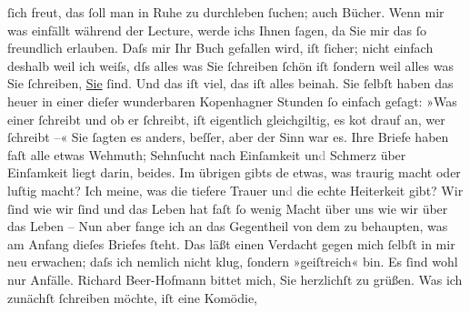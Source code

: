 \begin{ledgroupsized}[t]{13cm}
               ſich freut, das ſoll man in Ruhe zu durchleben ſuchen; auch Bücher. Wenn mir was
               einfällt während der Lecture, werde ichs Ihnen ſagen, da Sie mir das ſo freundlich
               erlauben. Daſs {\pb}mir Ihr Buch gefallen wird, iſt
               ſicher; nicht einfach deshalb weil ich weiſs, dſs alles was Sie ſchreiben ſchön iſt
               ſondern weil alles was Sie ſchreiben, \uline{Sie}{ }ſind. Und das iſt viel, das iſt alles beinah. Sie
               ſelbſt haben das heuer in einer dieſer wunderbaren Kopenhagner Stunden ſo einfach geſagt: »Was einer ſchreibt und ob er
               ſchreibt, iſt eigentlich gleichgiltig, es ko{\geminationm}t drauf an,
               wer ſchreibt –« Sie ſagten es anders, beſſer, aber der Sinn {\pb}war es.\pend
           \pstart
           Ihre Briefe haben faſt alle etwas Wehmuth; Sehnſucht nach Einſamkeit
                  un\textcolor{gray}{d}{ }Schmerz über Einſamkeit liegt darin, beides. Im
               übrigen gibts de{\geminationn} etwas, was traurig macht oder luſtig
               macht? Ich meine, was die tiefere Trauer un\textcolor{gray}{d} die echte Heiterkeit
               gibt? Wir ſind wie wir ſind und das Leben hat faſt ſo wenig Macht über uns wie wir
               über das Leben – Nun aber fange ich an das Gegentheil von dem zu behaupten, {\pb}was am Anfang dieſes Briefes ſteht. Das läßt einen
               Verdacht gegen mich ſelbſt in mir neu erwachen; daſs ich nemlich nicht klug, ſondern
               »geiſtreich« bin. Es ſind wohl nur Anfälle.\pend
           \pstart
           Richard Beer-Hofmann bittet mich, Sie herzlichſt
               zu grüßen.\pend
           \pstart
           Was ich zunächſt ſchreiben möchte, iſt eine Komödie, \label{K_L00643_1v}
\end{ledgroupsized}
